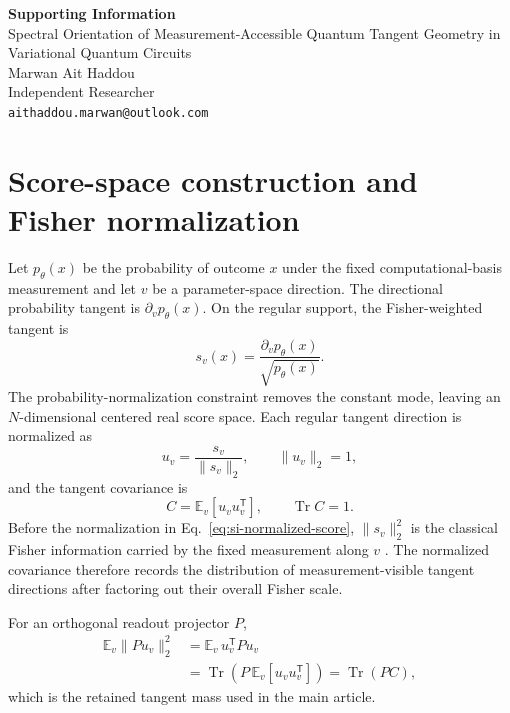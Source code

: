 \documentclass[ASNA,twocolumn]{USG}
\newcommand{\Tr}{\operatorname{Tr}}
\begin{document}
\begin{center}
{\Large\bfseries Supporting Information}\\[6pt]
{\large Spectral Orientation of Measurement-Accessible Quantum Tangent Geometry in Variational Quantum Circuits}\\[8pt]
Marwan Ait Haddou\\
Independent Researcher\\
\texttt{aithaddou.marwan@outlook.com}
\end{center}

\section{Score-space construction and Fisher normalization}

Let $p_\theta(x)$ be the probability of outcome $x$ under the fixed computational-basis measurement and let $v$ be a parameter-space direction. The directional probability tangent is $\partial_v p_\theta(x)$. On the regular support, the Fisher-weighted tangent is
\begin{equation}
 s_v(x)=\frac{\partial_v p_\theta(x)}{\sqrt{p_\theta(x)}}.
\label{eq:si-score}
\end{equation}
The probability-normalization constraint removes the constant mode, leaving an $N$-dimensional centered real score space. Each regular tangent direction is normalized as
\begin{equation}
 u_v=\frac{s_v}{\|s_v\|_2},\qquad \|u_v\|_2=1,
\label{eq:si-normalized-score}
\end{equation}
and the tangent covariance is
\begin{equation}
 C=\mathbb E_v[u_vu_v^{\mathsf T}],\qquad \Tr C=1.
\label{eq:si-C}
\end{equation}
Before the normalization in Eq.~\eqref{eq:si-normalized-score}, $\|s_v\|_2^2$ is the classical Fisher information carried by the fixed measurement along $v$ \cite{BraunsteinCaves1994,LuLuoOh2012}. The normalized covariance therefore records the distribution of measurement-visible tangent directions after factoring out their overall Fisher scale.

For an orthogonal readout projector $P$,
\begin{align}
\mathbb E_v\|Pu_v\|_2^2
&=\mathbb E_v\,u_v^{\mathsf T}Pu_v \\
&=\Tr\!\left(P\,\mathbb E_v[u_vu_v^{\mathsf T}]\right)
=\Tr(PC),
\label{eq:si-R}
\end{align}
which is the retained tangent mass used in the main article.
\end{document}
